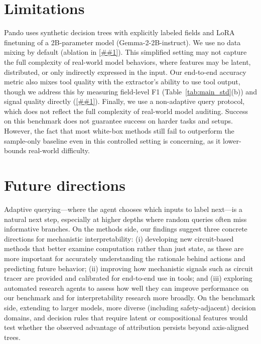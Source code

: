\documentclass{article} %
\newcommand{\Cref}[1]{\ref{##1}}
\newcommand{\bench}{Pando}
\begin{document}
\section{Limitations}
\label{app:limitations}

\bench{} uses synthetic decision trees with explicitly labeled fields and LoRA finetuning of a 2B-parameter model (Gemma-2-2B-instruct).
We use no data mixing by default (ablation in \Cref{app:mixing}).
This simplified setting may not capture the full complexity of real-world model behaviors, where features may be latent, distributed, or only indirectly expressed in the input.
Our end-to-end accuracy metric also mixes tool quality with the extractor's ability to use tool output, though we address this by measuring field-level F1 (Table~\ref{tab:main_std}(b)) and signal quality directly (\Cref{sec:mechanistic}).
Finally, we use a non-adaptive query protocol, which does not reflect the full complexity of real-world model auditing.
Success on this benchmark does not guarantee success on harder tasks and setups. However, the fact that most white-box methods still fail to outperform the sample-only baseline even in this controlled setting is concerning, as it lower-bounds real-world difficulty.

\section{Future directions}
\label{app:future}
Adaptive querying---where the agent chooses which inputs to label next---is a natural next step, especially at higher depths where random queries often miss informative branches.
On the methods side, our findings suggest three concrete directions for mechanistic interpretability: (i) developing new circuit-based methods that better examine computation rather than just state, as these are more important for accurately understanding the rationale behind actions and predicting future behavior; (ii) improving how mechanistic signals such as circuit tracer are provided and calibrated for end-to-end use in tools; and (iii) exploring automated research agents to assess how well they can improve performance on our benchmark and for interpretability research more broadly.
On the benchmark side, extending to larger models, more diverse (including safety-adjacent) decision domains, and decision rules that require latent or compositional features would test whether the observed advantage of attribution persists beyond axis-aligned trees.

\end{document}
